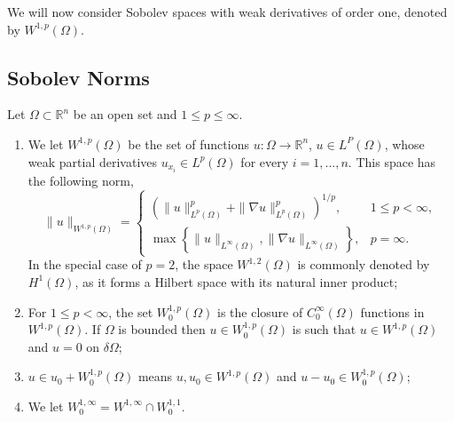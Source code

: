 We will now consider Sobolev spaces with weak derivatives of order one, denoted by $W^{1,p}(\Omega)$.

\subsection{Sobolev Norms}
\begin{definition}
    \label{def: Sobolev k =1}
    Let $\Omega \subset \mathbb{R}^n$ be an open set and $1 \le p \le \infty$.
    \begin{enumerate}
        \item[(i)]  We let $W^{1,p}(\Omega)$ be the set of functions $u : \Omega \rightarrow \mathbb{R}^n$, $u \in L^P(\Omega)$, whose weak partial derivatives $u_{x_i} \in L^p(\Omega)$ for every $i=1,...,n$. This space has the following norm,
        \[
        \|u\|_{W^{1,p}(\Omega)}
        =
        \begin{cases}
        \left(
        \|u\|_{L^p(\Omega)}^p
        +
        \|\nabla u\|_{L^p(\Omega)}^p
        \right)^{1/p},
        & 1\leq p<\infty, \\[1.5ex]
        \max\left\{
        \|u\|_{L^\infty(\Omega)},
        \|\nabla u\|_{L^\infty(\Omega)}
        \right\},
        & p=\infty.
        \end{cases}
        \]
        In the special case of \(p=2\), the space \(W^{1,2}(\Omega)\) is commonly denoted by \(H^1(\Omega)\), as it forms a Hilbert space with its natural inner product;
        
        \item[(ii)] For $1\leq p<\infty$, the set $W_0^{1,p}(\Omega)$ is the closure of $C_0^\infty(\Omega)$ functions in $W^{1,p}(\Omega)$. If $\Omega$ is bounded then $u \in W_0^{1,p}(\Omega)$ is such that $u \in W^{1,p}(\Omega)$ and $u=0$ on $\delta\Omega$;

        \item[(iii)] $u \in u_0 + W^{1,p}_0(\Omega)$ means $u,u_0 \in W^{1,p}(\Omega)$ and $u-u_0 \in W^{1,p}_0(\Omega)$;

        \item[(iv)] We let $W^{1,\infty}_0 = W^{1,\infty} \cap W^{1,1}_0$.
    \end{enumerate}
\end{definition}

